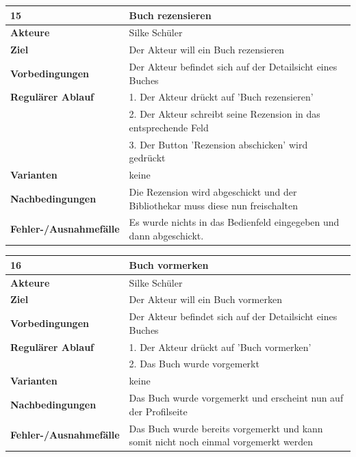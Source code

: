 \documentclass[fontsize=12pt,paper=a4,twoside]{scrartcl}
\begin{document}
\begin{table}[htbp]
\label{15}
\begin{tabular}{|l|p{10cm}|}
\hline 
\textbf{15} & \textbf{Buch rezensieren} \\ \hline
\textbf{Akteure} & Silke Schüler\\ \hline
\textbf{Ziel} & Der Akteur will ein Buch rezensieren \\ \hline
\textbf{Vorbedingungen} & Der Akteur befindet sich auf der Detailsicht eines Buches \\ \hline
\textbf{Regulärer Ablauf} & 
1. Der Akteur drückt auf 'Buch rezensieren' \\
&2. Der Akteur schreibt seine Rezension in das entsprechende Feld\\
&3. Der Button 'Rezension abschicken' wird gedrückt\\
\hline
\textbf{Varianten} & 
keine \\ \hline
\textbf{Nachbedingungen} & Die Rezension wird abgeschickt und der Bibliothekar muss diese nun 
freischalten\\ \hline
\textbf{Fehler-/Ausnahmefälle} & Es wurde nichts in das Bedienfeld eingegeben und dann abgeschickt.\\
\hline
\end{tabular}
\end{table}

\begin{table}[htbp]
\label{16}
\begin{tabular}{|l|p{10cm}|}
\hline 
\textbf{16} & \textbf{Buch vormerken} \\ \hline
\textbf{Akteure} & Silke Schüler\\ \hline
\textbf{Ziel} & Der Akteur will ein Buch vormerken \\ \hline
\textbf{Vorbedingungen} & Der Akteur befindet sich auf der Detailsicht eines Buches \\ \hline
\textbf{Regulärer Ablauf} & 
1. Der Akteur drückt auf 'Buch vormerken' \\
&2. Das Buch wurde vorgemerkt\\
\hline
\textbf{Varianten} & 
keine \\ \hline
\textbf{Nachbedingungen} & Das Buch wurde vorgemerkt und erscheint nun auf der Profilseite\\ \hline
\textbf{Fehler-/Ausnahmefälle} & Das Buch wurde bereits vorgemerkt und kann somit nicht noch einmal 
vorgemerkt werden\\
\hline
\end{tabular}
\end{table}
\end{document}

